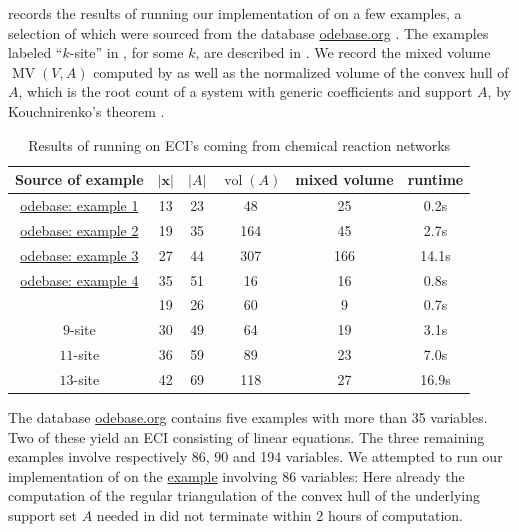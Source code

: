 \documentclass[a4paper]{article}
\theoremstyle{remark}
\def\xx{\mathbf{x}}
\DeclareMathOperator{\mv}{MV}
\DeclareMathOperator{\vol}{vol}
\begin{document}
 records the results of running our implementation
of  on a few examples, a selection of which were sourced
from the database \url{odebase.org}
\cite{ludersODEbaseRepositoryODE2022}. The examples labeled
``$k$-site'' in , for some $k$, are described in
\cite{feliuRootBoundsVertical2026}. We record the mixed volume
$\mv(V,A)$ computed by  as well as the normalized volume
of the convex hull of $A$, which is the root count of a system with
generic coefficients and support $A$, by Kouchnirenko's theorem
\cite{kouchnirenko1976}.

\begin{table}[H]
  \small
\centering
\caption{Results of running  on ECI's coming from chemical reaction networks}
\begin{tabular}{ |c|c|c|c|c|c| } 
  \hline
  Source of example & $|\xx|$ & $|A|$ & $\vol(A)$ & mixed volume & runtime\\
  \hline\hline
  \href{https://odebase.org/detail/1603}{odebase: example 1} & 13 & 23 & 48 & 25 & 0.2s\\
  \hline
  \href{https://odebase.org/detail/1532}{odebase: example 2} & 19 & 35 & 164 & 45 & 2.7s\\
  \hline
  \href{https://odebase.org/detail/1591}{odebase: example 3} & 27 & 44 & 307 & 166 & 14.1s\\
  \hline
  \href{https://odebase.org/detail/1641}{odebase: example 4} & 35 & 51 & 16 & 16 & 0.8s\\
  \hline
  \cite{grossAlgebraicSystemsBiology2016} & 19 & 26 & 60 & 9 & 0.7s\\ 
  \hline
  $9$-site & 30 & 49 & 64 & 19 & 3.1s\\
  \hline
  $11$-site & 36 & 59 & 89 & 23 & 7.0s\\
  \hline
  $13$-site & 42 & 69 & 118 & 27 & 16.9s\\
  \hline
\end{tabular}
\label{tab:reaction}
\end{table}

The database \url{odebase.org} contains five examples with more than
35 variables. Two of these yield an ECI consisting of linear
equations. The three remaining examples involve respectively 86, 90
and 194 variables. We attempted to run our implementation of
 on the \href{https://odebase.org/detail/1334}{example}
involving 86 variables: Here already the computation of the regular
triangulation of the convex hull of the underlying support set $A$
needed in  did not terminate within 2 hours of
computation.
\end{document}
